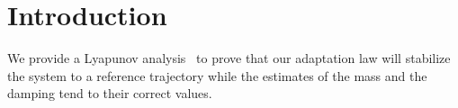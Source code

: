 \section{Introduction}
\label{sec:intro}

We provide a Lyapunov analysis~\cite{khalil2015nonlinear} to prove that our
adaptation law will stabilize the system to a reference trajectory while the
estimates of the mass and the damping tend to their correct values.
